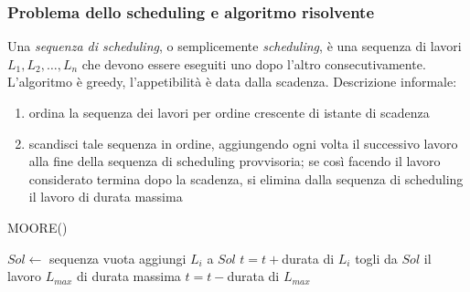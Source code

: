 \documentclass[11pt]{book}
\begin{document}
\subsubsection{Problema dello scheduling e algoritmo risolvente}
Una \textit{sequenza di scheduling}, o semplicemente \textit{scheduling}, è una sequenza di lavori $L_1,L_2,\dots,L_n$ che 
devono essere eseguiti uno dopo l'altro consecutivamente. L'algoritmo è greedy, l'appetibilità è data dalla scadenza. 
Descrizione informale:
\begin{enumerate}
    \item ordina la sequenza dei lavori per ordine crescente di istante di scadenza 
    \item scandisci tale sequenza in ordine, aggiungendo ogni volta il successivo lavoro alla fine della sequenza di scheduling 
    provvisoria; se così facendo il lavoro considerato termina dopo la scadenza, si elimina dalla sequenza di scheduling 
    il lavoro di durata massima 
\end{enumerate}
\begin{algorithm}
    \caption{MOORE()}
    \begin{algorithmic}
        \State $Sol \gets$ sequenza vuota
        \State aggiungi $L_i$ a $Sol$
        \State $t=t+$durata di $L_i$
                \State togli da $Sol$ il lavoro $L_{max}$ di durata massima 
                \State $t=t-$durata di $L_{max}$
            \EndIf 
        \EndFor
    \end{algorithmic}
\end{algorithm}
\end{document}
